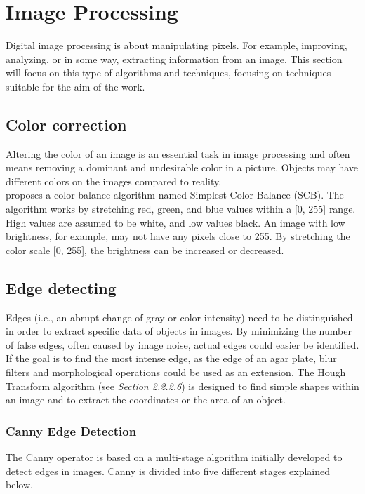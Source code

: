 \section{Image Processing}

\noindent Digital image processing is about manipulating pixels. For example, improving, analyzing, or in some way, extracting information from an image. This section will focus on this type of algorithms and techniques, focusing on techniques suitable for the aim of the work.

\subsection{Color correction}
Altering the color of an image is an essential task in image processing and often means removing a dominant and undesirable color in a picture. Objects may have different colors on the images compared to reality. \\

\noindent \cite{Limare} proposes a color balance algorithm named Simplest Color Balance (SCB). The algorithm works by stretching red, green, and blue values within a [0, 255] range. High values are assumed to be white, and low values black. An image with low brightness, for example, may not have any pixels close to 255. By stretching the color scale [0, 255], the brightness can be increased or decreased. 


\subsection{Edge detecting}
\noindent Edges (i.e., an abrupt change of gray or color intensity) need to be distinguished in order to extract specific data of objects in images. By minimizing the number of false edges, often caused by image noise,  actual edges could easier be identified. If the goal is to find the most intense edge, as the edge of an agar plate, blur filters and morphological operations could be used as an extension. The Hough Transform algorithm (see \textit{Section 2.2.2.6}) is designed to find simple shapes within an image and to extract the coordinates or the area of an object.



\subsubsection{Canny Edge Detection}
The Canny operator\cite{Xuan} is based on a multi-stage algorithm initially developed to detect edges in images. Canny is divided into five different stages explained below. \\

